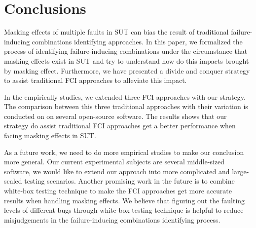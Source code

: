 \documentclass{sig-alternate}
\begin{document}
\section{Conclusions}
Masking effects of multiple faults in SUT can bias the result of traditional failure-inducing combinations identifying approaches. In this paper, we formalized the process of identifying failure-inducing combinations under the circumstance that masking effects exist in SUT and try to understand how do this impacts brought by masking effect. Furthermore, we have presented a divide and conquer strategy to assist traditional FCI approaches to alleviate this impact.


In the empirically studies, we extended three FCI approaches with our strategy. The comparison between this three traditional approaches with their variation is conducted on on several open-source software. The results shows that our strategy do assist traditional FCI approaches get a better performance when facing masking effects in SUT.

As a future work, we need to do more empirical studies to make our conclusion more general. Our current experimental subjects are several middle-sized software, we would like to extend our approach into more complicated and large-scaled testing scenarios. Another promising work in the future is to combine white-box testing technique to make the FCI approaches get more accurate results when handling masking effects. We believe that figuring out the faulting levels of different bugs through white-box testing technique is helpful to reduce misjudgements in the failure-inducing combinations identifying process.


\end{document}
